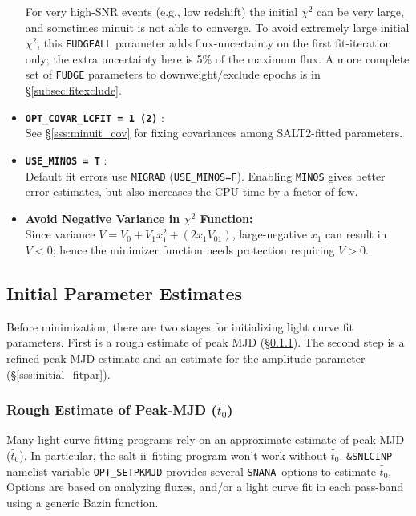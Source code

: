 \documentclass[12pt]{article}
\newcommand{\SALTII}{{\sc salt-ii}}
\newcommand{\SNANA}{{\tt SNANA}}
\newcommand{\minuit}{{\sc minuit}}
\begin{document}
\begin{itemize}
    For very high-SNR events (e.g., low redshift) the initial $\chi^2$
    can be very large, and sometimes {\minuit} is not able to converge.
    To avoid extremely large initial $\chi^2$, this {\tt FUDGEALL} 
    parameter adds flux-uncertainty on the first fit-iteration only; 
    the extra uncertainty here is 5\% of the maximum flux.
    A more complete set of {\tt FUDGE} parameters to downweight/exclude
    epochs is in \S\ref{subsec:fitexclude}.
%
  \item {\bf\tt OPT\_COVAR\_LCFIT = 1 (2)} : \\
     See \S\ref{sss:minuit_cov} for fixing covariances among
     SALT2-fitted parameters.
% 
   \item {\bf\tt USE\_MINOS = T} : \\
     Default fit errors use {\tt MIGRAD} ({\tt USE\_MINOS=F}).
     Enabling {\tt MINOS} gives better error estimates,
     but also increases the CPU time by a factor of few.     
%
   \item {\bf Avoid Negative Variance in $\chi^2$ Function:} \\
     Since variance $V = V_0 + V_1 x_1^2 + (2 x_1 V_{01})$,
     large-negative $x_1$ can result in $V<0$; hence the 
     minimizer function needs protection requiring $V>0$.
\end{itemize}

   \newcommand{\toApprox}{\tilde{t_0}}
   \subsection{Initial Parameter Estimates}
   \label{subsec:fitpar_init}

Before minimization, there are two stages for initializing 
light curve fit parameters. First is a rough estimate of
peak MJD (\S\ref{sss:initial_peakmjd}). The second step
is a refined peak MJD estimate and an estimate for the
amplitude parameter (\S\ref{sss:initial_fitpar}).

   \subsubsection{Rough Estimate of Peak-MJD ($\toApprox$) }
   \label{sss:initial_peakmjd}

Many light curve fitting programs rely on an approximate estimate 
of peak-MJD ($\toApprox$). In particular, the \SALTII\ fitting program
won't work without $\toApprox$. 
{\tt \&SNLCINP} namelist variable {\tt OPT\_SETPKMJD}
provides several \SNANA\ options to estimate $\toApprox$,
Options are based on analyzing fluxes, and/or a light curve fit
in each pass-band using a generic Bazin function.
\end{document}
